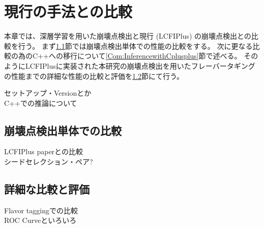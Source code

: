 
\chapter{現行の手法との比較} \label{chap:Comparison}

本章では、深層学習を用いた崩壊点検出と現行 (LCFIPlus) の崩壊点検出との比較を行う。
まず\ref{Com:ComparisonwithVF}節では崩壊点検出単体での性能の比較をする。
次に更なる比較の為のC++への移行について\ref{Com:InferencewithCplusplus}節で述べる。
そのようにLCFIPlusに実装された本研究の崩壊点検出を用いたフレーバータギングの性能までの詳細な性能の比較と評価を\ref{Com:DetailedComparisonandEvaluation}節にて行う。

セットアップ・Versionとか\\
C++での推論について\\

\section{崩壊点検出単体での比較} \label{Com:ComparisonwithVF}

LCFIPlus paperとの比較\\
シードセレクション・ペア?\\

\section{詳細な比較と評価} \label{Com:DetailedComparisonandEvaluation}

Flavor taggingでの比較\\
ROC Curveといろいろ\\

